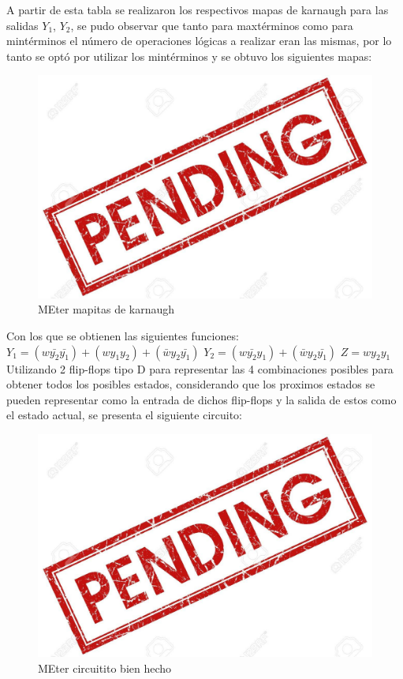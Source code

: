 A partir de esta tabla se realizaron los respectivos mapas de karnaugh para las salidas $Y_1$, $Y_2$, se pudo observar que tanto para maxtérminos como para mintérminos el número de operaciones lógicas a realizar eran las mismas, por lo tanto se optó por utilizar los mintérminos y se obtuvo los siguientes mapas:

\begin{figure}[H]
\centering
\includegraphics{ImagenesEjercicio2/pend.jpg}
\caption{MEter mapitas de karnaugh}
\end{figure}
Con los que se obtienen las siguientes funciones:
$Y_1=(w\bar{y_2}\bar{y_1})+(wy_1y_2)+(\bar{w}y_2\bar{y_1})$
$Y_2=(w\bar{y_2}y_1)+(\bar{w}y_2\bar{y_1})$
$Z=wy_2y_1$
Utilizando 2 flip-flops tipo D para representar las 4 combinaciones posibles para obtener todos los posibles estados, considerando que los proximos estados se pueden representar como la entrada de dichos flip-flops y la salida de estos como el estado actual, se presenta el siguiente circuito:
\begin{figure}[H]
\centering
\includegraphics{ImagenesEjercicio2/pend.jpg}
\caption{MEter circuitito bien hecho }
\end{figure}


